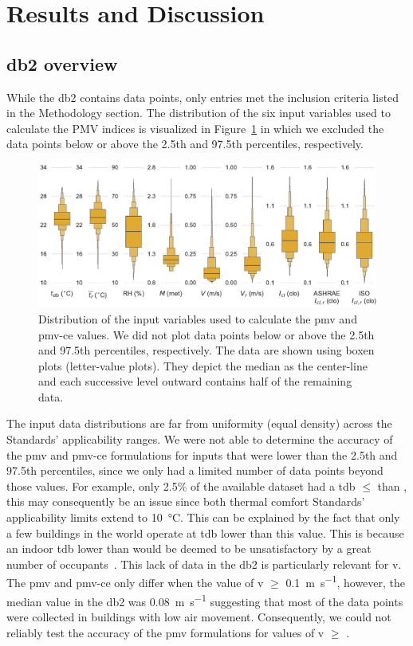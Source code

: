 \section{Results and Discussion}\label{sec:results}

\subsection{\ac{db2} overview}\label{subsec:comfort-db-overview}
While the \ac{db2} contains  data points, only  entries met the inclusion criteria listed in the Methodology section.
The distribution of the six input variables used to calculate the PMV indices is visualized in Figure~\ref{fig:dist_input_data} in which we excluded the data points below or above the 2.5th and 97.5th percentiles, respectively.
\begin{figure}[htb!]
    \centering
    \includegraphics[width=\textwidth]{figures/dist_input_data}
    \caption{Distribution of the input variables used to calculate the \ac{pmv} and \ac{pmv-ce} values.
    We did not plot data points below or above the 2.5th and 97.5th percentiles, respectively.
    The data are shown using boxen plots (letter-value plots).
    They depict the median as the center-line and each successive level outward contains half of the remaining data.}
    \label{fig:dist_input_data}
\end{figure}
The input data distributions are far from uniformity (equal density) across the Standards' applicability ranges.
We were not able to determine the accuracy of the \ac{pmv} and \ac{pmv-ce} formulations for inputs that were lower than the 2.5th and 97.5th percentiles, since we only had a limited number of data points beyond those values.
For example, only 2.5\% of the available dataset had a \ac{tdb} $\leq$ than , this may consequently be an issue since both thermal comfort Standards' applicability limits extend to \qty{10}{\celsius}.
This can be explained by the fact that only a few buildings in the world operate at \ac{tdb} lower than this value.
This is because an indoor \ac{tdb} lower than  would be deemed to be unsatisfactory by a great number of occupants~\cite{iso7730}.
This lack of data in the \ac{db2} is particularly relevant for \ac{v}.
The \ac{pmv} and \ac{pmv-ce} only differ when the value of \ac{v} $\geq$ \qty{0.1}{\m\per\s}, however, the median value in the \ac{db2} was \qty{0.08}{\m\per\s} suggesting that most of the data points were collected in buildings with low air movement.
Consequently, we could not reliably test the accuracy of the \ac{pmv} formulations for values of \ac{v} $\geq$ .

